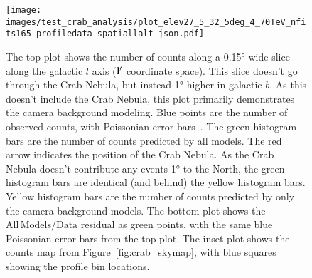   \begin{figure}[p]
    \centering
    \texttt{[image: images/test\_crab\_analysis/plot\_elev27\_5\_32\_5deg\_4\_70TeV\_nfits165\_profiledata\_spatiallalt\_json.pdf]}
    \caption[Crab Nebula Profile along Galactic $l$ Off Source]
    {
      The top plot shows the number of counts along a \ang{0.15}-wide-slice along the galactic $l$ axis ($\mathbf{l'}$ coordinate space).
      This slice doesn't go through the Crab Nebula, but instead \ang{1} higher in galactic $b$.
      As this doesn't include the Crab Nebula, this plot primarily demonstrates the camera background modeling.
      Blue points are the number of observed counts, with Poissonian error bars~\cite{poissonfrequentistinterval}.
      The green histogram bars are the number of counts predicted by all models.
      The red arrow indicates the position of the Crab Nebula.
      As the Crab Nebula doesn't contribute any events \ang{1} to the North, the green histogram bars are identical (and behind) the yellow histogram bars.
      Yellow histogram bars are the number of counts predicted by only the camera-background models.
      The bottom plot shows the $\mathrm{All\,Models}/\mathrm{Data}$ residual as green points, with the same blue Poissonian error bars from the top plot.
      The inset plot shows the counts map from Figure~\ref{fig:crab_skymap}, with blue squares showing the profile bin locations.
    }
    \label{fig:crab_profile_l_off}
  \end{figure}


